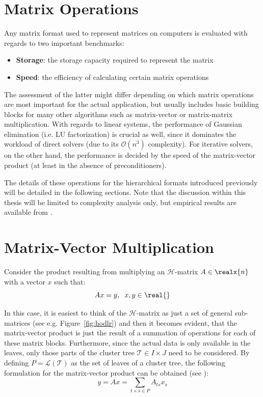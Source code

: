 \section{Matrix Operations}
\label{sec:matrix_operations}

Any matrix format used to represent matrices on computers is evaluated with regards to two important benchmarks:
\begin{itemize}
    \item \textbf{Storage}: the storage capacity required to represent the matrix
    \item \textbf{Speed}: the efficiency of calculating certain matrix operations
\end{itemize}

The assessment of the latter might differ depending on which matrix operations are most important for the actual application, but usually includes basic building blocks for many other algorithms such as matrix-vector or matrix-matrix multiplication. With regards to linear systems, the performance of Gaussian elimination (i.e. LU factorization) is crucial as well, since it dominates the workload of direct solvers (due to its $\mathcal{O}(n^3)$ complexity). For iterative solvers, on the other hand, the performance is decided by the speed of the matrix-vector product (at least in the absence of preconditioners).

The details of these operations for the hierarchical formats introduced previously will be detailed in the following sections. Note that the discussion within this thesis will be limited to complexity analysis only, but empirical results are available from \cite{spalthoff_pg_hierarchical_2020}.


\section{Matrix-Vector Multiplication}
\label{sec:matrix_vector}

Consider the product resulting from multiplying an  $\mathcal{H}$-matrix $A \in \realx{n}$ with a vector $x$ such that:
\begin{equation}
    Ax = y, \; \; x,y \in \real{}
\end{equation}

\noindent In this case, it is easiest to think of the $\mathcal{H}$-matrix as just a set of general sub-matrices (see e.g. Figure~\hyperref[fig:hodlr]{\ref{fig:hodlr}}) and then it becomes evident, that the matrix-vector product is just the result of a summation of operations for each of these matrix blocks. Furthermore, since the actual data is only available in the leaves, only those parts of the cluster tree $\mathcal{T} \in I \times J$ need to be considered. By defining $P = \mathcal{L}(\mathcal{T})$ as the set of leaves of a cluster tree, the following formulation for the matrix-vector product can be obtained (see  \cite{bebendorf_hierarchical_2008}):
\begin{equation}
    y=Ax = \sum_{t \times s \in P}{A_{ts}x_s}
\end{equation}

